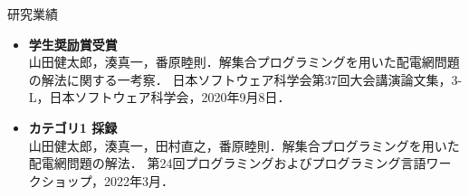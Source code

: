 \documentclass[dvipdfmx,11pt]{beamer}
\begin{document}
\begin{frame}{研究業績}
 \begin{itemize}
  \small
  \item \alert{\bf 学生奨励賞受賞}\\
        山田健太郎，湊真一，番原睦則．解集合プログラミングを用いた配電網問題の解法に関する一考察．
        日本ソフトウェア科学会第37回大会講演論文集，3-L，日本ソフトウェア科学会，2020年9月8日．
  \item \alert{\bf カテゴリ1 採録}\\
        山田健太郎，湊真一，田村直之，番原睦則．解集合プログラミングを用いた配電網問題の解法．
        第24回プログラミングおよびプログラミング言語ワークショップ，2022年3月．
 \end{itemize}
\end{frame}


\end{document}
